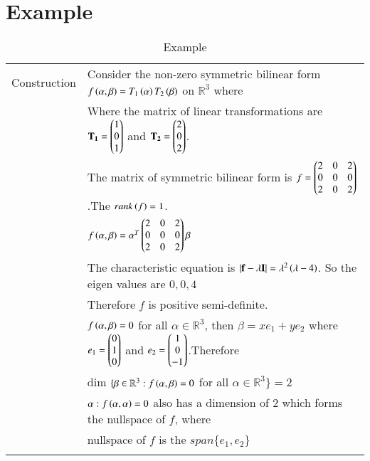 \documentclass[journal,12pt]{IEEEtran}
\begin{document}
\section{Example}
\renewcommand{\thetable}{3}
\begin{longtable}{|l|l|}
    \hline
    Construction &Consider the non-zero symmetric bilinear form $f\left(\alpha,\beta\right)=T_1\left(\alpha\right)T_2\left(\beta\right)$ on $\mathbb{R}^3$ where\\
    &Where the matrix of linear transformations are $\mathbf{T_1}=\begin{pmatrix}1\\0\\1\end{pmatrix}$ and $\mathbf{T_2}=\begin{pmatrix}2\\0\\2\end{pmatrix}$.\\
    &The matrix of symmetric bilinear form is $f=\begin{pmatrix}2&0&2\\0&0&0\\2&0&2\end{pmatrix}$.The $rank\left(f\right)=1$.\\
    &$f\left(\alpha,\beta\right)=\alpha^T\begin{pmatrix}2&0&2\\0&0&0\\2&0&2\end{pmatrix}\beta$\\
    &The characteristic equation is  $\mathbf{\left\vert f-\lambda\mathbf{I}\right\vert}=\lambda^2\left(\lambda-4\right)$. So the eigen values are $0,0,4$\\
    \hline
    &Therefore $f$ is positive semi-definite.\\
    &$f\left(\alpha,\beta\right)=0$ for all $\alpha\in\mathbb{R}^3$, then $\beta=xe_1+ye_2$ where $e_1=\begin{pmatrix}0\\1\\0\end{pmatrix}$ and $e_2=\begin{pmatrix}1\\0\\-1\end{pmatrix}$.Therefore\\
    &dim $\{\beta\in\mathbb{R}^3:f\left(\alpha,\beta\right)=0$ for all $\alpha\in\mathbb{R}^3\}=2$\\
    &$\alpha:f\left(\alpha,\alpha\right)=0$ also has a dimension of 2 which forms the nullspace of $f$, where \\
    &nullspace of $f$ is the $span\{e_1,e_2\}$\\ 
    \hline
    \caption{Example}
    \label{tab:example}
\end{longtable}
\end{document}
